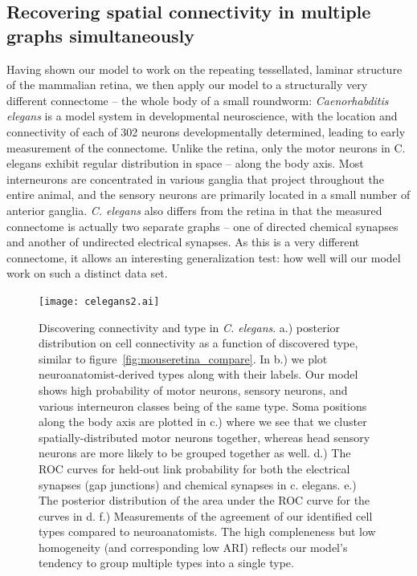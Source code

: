 \documentclass{article}
\begin{document}
\subsection*{Recovering spatial connectivity in multiple graphs simultaneously}

Having shown our model to work on the repeating tessellated, laminar
structure of the mammalian retina, we then apply our model to a
structurally very different connectome -- the whole body of a small
roundworm: \textit{Caenorhabditis elegans} is a model system in
developmental neuroscience\autocite{White1986}, with the location and
connectivity of each of 302 neurons developmentally determined,
leading to early measurement of the connectome. Unlike the retina,
only the motor neurons in C. elegans exhibit regular distribution in
space -- along the body axis. Most interneurons are concentrated in
various ganglia that project throughout the entire animal, and the
sensory neurons are primarily located in a small number of anterior
ganglia. \textit{C. elegans} also differs from the retina in that the
measured connectome is actually two separate graphs -- one of directed
chemical synapses and another of undirected electrical synapses. As
this is a very different connectome, it allows an interesting
generalization test: how well will our model work on such a distinct
data set.

\begin{figure}
  \centering 
  \centerline{\texttt{[image: celegans2.ai]}}
  \caption{Discovering connectivity and type in
    \textit{C. elegans}. a.) posterior distribution on cell
    connectivity as a function of discovered type, similar to
    figure~\ref{fig:mouseretina_compare}. In b.) we plot
    neuroanatomist-derived types along with their labels. Our model
    shows high probability of motor neurons, sensory neurons, and
    various interneuron classes being of the same type. Soma positions
    along the body axis are plotted in c.) where we see that we
    cluster spatially-distributed motor neurons together, whereas head
    sensory neurons are more likely to be grouped together as well.
    d.) The ROC curves for held-out link probability for both the
    electrical synapses (gap junctions) and chemical synapses in
    c. elegans. e.) The posterior distribution of the area under the
    ROC curve for the curves in d. f.) Measurements of the agreement
    of our identified cell types compared to neuroanatomists. The high
    compleneness but low homogeneity (and corresponding low ARI)
    reflects our model's tendency to group multiple types into a
    single type.}
  \label{fig:celegans}
\end{figure}
\end{document}
